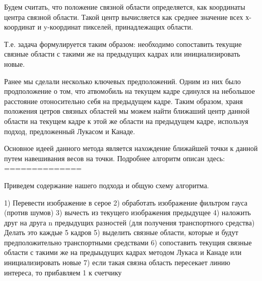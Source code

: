 \documentclass[12pt,a4paper,oneside,titlepage]{article}
\begin{document}
Будем считать, что положение связной области определяется, как координаты центра связной области.
Такой центр вычисляется как среднее значение всех х-координат и y-координат пикселей, принадлежащих области.

Т.е. задача формулируется таким образом: необходимо сопоставить текущие связные области с такими же на предыдущих кадрах или инициализировать новые.


Ранее мы сделали несколько ключевых предположений.
Одним из них было продположение о том, что атвомобиль на текущем кадре сдинулся на небольшое расстояние отоносительно себя на предыдущем кадре.
Таким образом, храня положения цетров связных областей мы можем найти ближаший центр данной области на текущем кадре к этой же области на предыдущем кадре, используя подход, предложенный Лукасом и Канаде.

Основное идеей данного метода является нахождение ближайшей точки к данной путем навешивания весов на точки.
Подробнее алгоритм описан здесь: ==============



Приведем содержание нашего подхода и общую схему алгоритма.

1) Перевести изображение в серое
2) обработать изображение фильтром гауса (против шумов)
3) вычесть из текущего изображения предыдущее
4) наложить друг на друга n предыдущих разностей (для получения транспортного средства) Делать это каждые 5 кадров
5) выделить связные области, которые и будут предположительно транспортными средствами 
6) сопоставить текущия связные области с такими же на предыыдущих кадрах методом Лукаса и Канаде или инициализировать новые
7) если такая связна область пересекает линию интереса, то прибавляем 1 к счетчику
\end{document}

